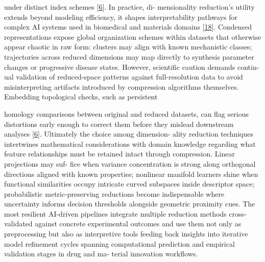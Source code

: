 \documentclass[
]{article}
\begin{document}
under distinct index schemes {[}\protect\hyperlink{_bookmark46}{6}{]}.
In practice, di- mensionality reduction's utility extends beyond
modeling efficiency, it shapes interpretability pathways for complex AI
systems used in biomedical and materials domains
{[}\protect\hyperlink{_bookmark58}{18}{]}. Condensed representations
expose global organization schemes within datasets that otherwise appear
chaotic in raw form: clusters may align with known mechanistic classes;
trajectories across reduced dimensions may map directly to synthesis
parameter changes or progressive disease states. However, scientific
caution demands contin- ual validation of reduced-space patterns against
full-resolution data to avoid misinterpreting artifacts introduced by
compression algorithms themselves. Embedding topological checks, such as
persistent

homology comparisons between original and reduced datasets, can flag
serious distortions early enough to correct them before they mislead
downstream analyses {[}\protect\hyperlink{_bookmark46}{6}{]}. Ultimately
the choice among dimension- ality reduction techniques intertwines
mathematical considerations with domain knowledge regarding what feature
relationships must be retained intact through compression. Linear
projections may suf- fice when variance concentration is strong along
orthogonal directions aligned with known properties; nonlinear manifold
learners shine when functional similarities occupy intricate curved
subspaces inside descriptor space; probabilistic metric-preserving
reductions become indispensable where uncertainty informs decision
thresholds alongside geometric proximity cues. The most resilient
AI-driven pipelines integrate multiple reduction methods cross-validated
against concrete experimental outcomes and use them not only as
preprocessing but also as interpretive tools feeding back insights into
iterative model refinement cycles spanning computational prediction and
empirical validation stages in drug and ma- terial innovation workflows.
\end{document}
